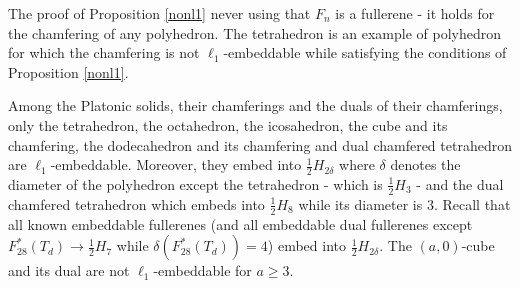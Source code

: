 \begin{remark}
The proof of Proposition \ref{nonl1} never using that $F_n$ is a fullerene - 
it holds for the chamfering of any polyhedron. The tetrahedron
is an example of polyhedron for which the chamfering is not $\ell_1$-embeddable
while satisfying the conditions of Proposition
\ref{nonl1}. 
\end{remark}

\begin{proposition}
Among the Platonic solids, their chamferings and the duals of their chamferings,
only the tetrahedron, the octahedron, the icosahedron, the cube and its chamfering, the dodecahedron
and its chamfering and dual chamfered tetrahedron are $\ell_1$-embeddable.
Moreover, they embed into $\frac{1}{2}H_{2\delta}$ where $\delta$ denotes the diameter 
of the polyhedron except the tetrahedron - which is $\frac{1}{2}H_{3}$ - and the dual chamfered tetrahedron which embeds into
$\frac{1}{2}H_{8}$ while its diameter is $3$. 
Recall that all known embeddable fullerenes (and all embeddable dual fullerenes
except $F^*_{28}(T_d)\to\frac{1}{2}H_{7}$ while $\delta(F^*_{28}(T_d))=4$)
embed into $\frac{1}{2}H_{2\delta}$.
The $(a,0)$-cube and its dual are not $\ell_1$-embeddable for $a\geq 3$. 
\end{proposition}

\newpage
